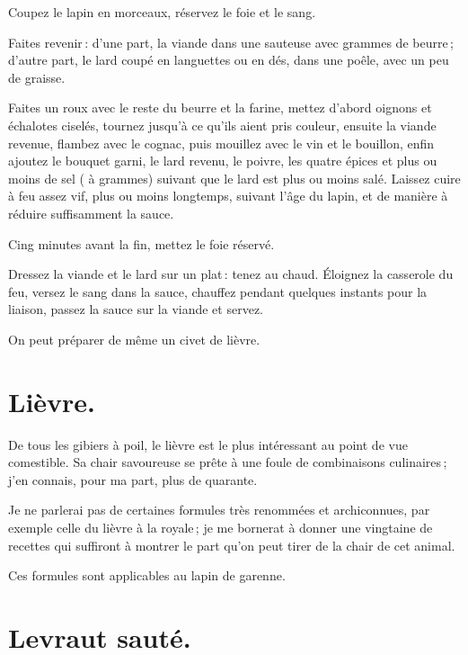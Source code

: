 Coupez le lapin en morceaux, réservez le foie et le sang.

Faites revenir : d'une part, la viande dans une sauteuse avec {\mmm}
grammes de beurre ; d'autre part, le lard coupé en languettes ou en dés, dans
une poêle, avec un peu de graisse.

Faites un roux avec le reste du beurre et la farine, mettez d'abord oignons et
échalotes ciselés, tournez jusqu'à ce qu'ils aient pris couleur, ensuite la
viande revenue, flambez avec le cognac, puis mouillez avec le vin et le
bouillon, enfin ajoutez le bouquet garni, le lard revenu, le poivre, les quatre
épices et plus ou moins de sel ({\mmm} à {\mmm} grammes) suivant que
le lard est plus ou moins salé. Laissez cuire à feu assez vif, plus ou moins
longtemps, suivant l’âge du lapin, et de manière à réduire suffisamment la
sauce.

Cing minutes avant la fin, mettez le foie réservé.

Dressez la viande et le lard sur un plat : tenez au chaud. Éloignez la
casserole du feu, versez le sang dans la sauce, chauffez pendant quelques
instants pour la liaison, passez la sauce sur la viande et servez.

\sk

On peut préparer de même un civet de lièvre.

\section*{\centering Lièvre.}
{}

De tous les gibiers à poil, le lièvre est le plus intéressant au point de vue
comestible. Sa chair savoureuse se prête à une foule de combinaisons
culinaires ; j'en connais, pour ma part, plus de quarante.

Je ne parlerai pas de certaines formules très renommées et archiconnues, par
exemple celle du lièvre à la royale ; je me bornerat à donner une vingtaine de
recettes qui suffiront à montrer le part qu'on peut tirer de la chair de cet
animal.

\medskip

Ces formules sont applicables au lapin de garenne.

\smallskip

\section*{\centering Levraut sauté.}
{}

